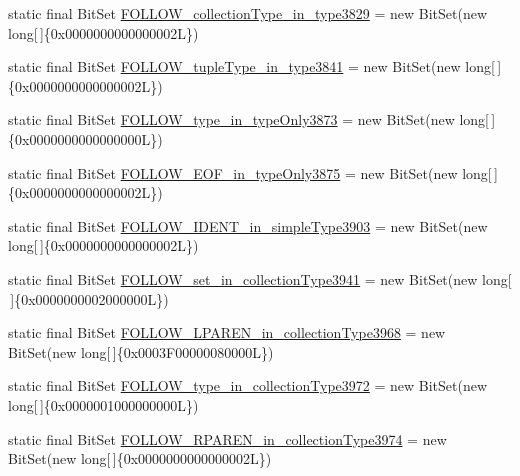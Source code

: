 \begin{DoxyCompactItemize}
static final Bit\-Set \hyperlink{classorg_1_1tzi_1_1use_1_1parser_1_1shell_1_1_shell_command_parser_a5309916e387ce5b4ca7b11d829d34b75}{F\-O\-L\-L\-O\-W\-\_\-collection\-Type\-\_\-in\-\_\-type3829} = new Bit\-Set(new long\mbox{[}$\,$\mbox{]}\{0x0000000000000002\-L\})
\item 
static final Bit\-Set \hyperlink{classorg_1_1tzi_1_1use_1_1parser_1_1shell_1_1_shell_command_parser_adf642470daafd249cffc435b3f8f8b24}{F\-O\-L\-L\-O\-W\-\_\-tuple\-Type\-\_\-in\-\_\-type3841} = new Bit\-Set(new long\mbox{[}$\,$\mbox{]}\{0x0000000000000002\-L\})
\item 
static final Bit\-Set \hyperlink{classorg_1_1tzi_1_1use_1_1parser_1_1shell_1_1_shell_command_parser_a4c82a20c3df6a0ccfeb6c9bec80858fc}{F\-O\-L\-L\-O\-W\-\_\-type\-\_\-in\-\_\-type\-Only3873} = new Bit\-Set(new long\mbox{[}$\,$\mbox{]}\{0x0000000000000000\-L\})
\item 
static final Bit\-Set \hyperlink{classorg_1_1tzi_1_1use_1_1parser_1_1shell_1_1_shell_command_parser_a6102b2ed97baebd0c00a5ab52cad29d1}{F\-O\-L\-L\-O\-W\-\_\-\-E\-O\-F\-\_\-in\-\_\-type\-Only3875} = new Bit\-Set(new long\mbox{[}$\,$\mbox{]}\{0x0000000000000002\-L\})
\item 
static final Bit\-Set \hyperlink{classorg_1_1tzi_1_1use_1_1parser_1_1shell_1_1_shell_command_parser_af46146934f0807a951f4aca3af208d4e}{F\-O\-L\-L\-O\-W\-\_\-\-I\-D\-E\-N\-T\-\_\-in\-\_\-simple\-Type3903} = new Bit\-Set(new long\mbox{[}$\,$\mbox{]}\{0x0000000000000002\-L\})
\item 
static final Bit\-Set \hyperlink{classorg_1_1tzi_1_1use_1_1parser_1_1shell_1_1_shell_command_parser_adca66786c088347954c6f54a120f54b2}{F\-O\-L\-L\-O\-W\-\_\-set\-\_\-in\-\_\-collection\-Type3941} = new Bit\-Set(new long\mbox{[}$\,$\mbox{]}\{0x0000000002000000\-L\})
\item 
static final Bit\-Set \hyperlink{classorg_1_1tzi_1_1use_1_1parser_1_1shell_1_1_shell_command_parser_adcaeb3d7e07347d6d8dbbcf84d8144e0}{F\-O\-L\-L\-O\-W\-\_\-\-L\-P\-A\-R\-E\-N\-\_\-in\-\_\-collection\-Type3968} = new Bit\-Set(new long\mbox{[}$\,$\mbox{]}\{0x0003\-F00000080000\-L\})
\item 
static final Bit\-Set \hyperlink{classorg_1_1tzi_1_1use_1_1parser_1_1shell_1_1_shell_command_parser_aacb2a795b8eeb4e5b30db8c0be686cea}{F\-O\-L\-L\-O\-W\-\_\-type\-\_\-in\-\_\-collection\-Type3972} = new Bit\-Set(new long\mbox{[}$\,$\mbox{]}\{0x0000001000000000\-L\})
\item 
static final Bit\-Set \hyperlink{classorg_1_1tzi_1_1use_1_1parser_1_1shell_1_1_shell_command_parser_af46f92fd71ff1714ab348cace068fe7c}{F\-O\-L\-L\-O\-W\-\_\-\-R\-P\-A\-R\-E\-N\-\_\-in\-\_\-collection\-Type3974} = new Bit\-Set(new long\mbox{[}$\,$\mbox{]}\{0x0000000000000002\-L\})

\end{DoxyCompactItemize}
